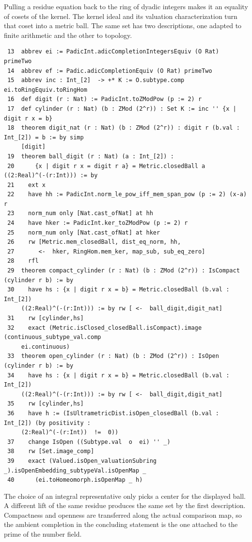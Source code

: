 \documentclass[12pt,letterpaper]{article}
\begin{document}
Pulling a residue equation back to the ring of dyadic integers makes it an equality of cosets of the kernel. The kernel ideal and its valuation characterization turn that coset into a metric ball. The same set has two descriptions, one adapted to finite arithmetic and the other to topology.
\par
{\fontsize{8.8}{10.5}\selectfont\begin{verbatim}
 13  abbrev ei := PadicInt.adicCompletionIntegersEquiv (O Rat) primeTwo
 14  abbrev ef := Padic.adicCompletionEquiv (O Rat) primeTwo
 15  abbrev inc : Int_[2]  -> +* K := O.subtype.comp ei.toRingEquiv.toRingHom
 16  def digit (r : Nat) := PadicInt.toZModPow (p := 2) r
 17  def cylinder (r : Nat) (b : ZMod (2^r)) : Set K := inc '' {x | digit r x = b}
 18  theorem digit_nat (r : Nat) (b : ZMod (2^r)) : digit r (b.val : Int_[2]) = b := by simp
     [digit]
 19  theorem ball_digit (r : Nat) (a : Int_[2]) :
 20      {x | digit r x = digit r a} = Metric.closedBall a ((2:Real)^(-(r:Int))) := by
 21    ext x
 22    have hh := PadicInt.norm_le_pow_iff_mem_span_pow (p := 2) (x-a) r
 23    norm_num only [Nat.cast_ofNat] at hh
 24    have hker := PadicInt.ker_toZModPow (p := 2) r
 25    norm_num only [Nat.cast_ofNat] at hker
 26    rw [Metric.mem_closedBall, dist_eq_norm, hh,
 27       <-  hker, RingHom.mem_ker, map_sub, sub_eq_zero]
 28    rfl
 29  theorem compact_cylinder (r : Nat) (b : ZMod (2^r)) : IsCompact (cylinder r b) := by
 30    have hs : {x | digit r x = b} = Metric.closedBall (b.val : Int_[2])
     ((2:Real)^(-(r:Int))) := by rw [ <-  ball_digit,digit_nat]
 31    rw [cylinder,hs]
 32    exact (Metric.isClosed_closedBall.isCompact).image (continuous_subtype_val.comp
     ei.continuous)
 33  theorem open_cylinder (r : Nat) (b : ZMod (2^r)) : IsOpen (cylinder r b) := by
 34    have hs : {x | digit r x = b} = Metric.closedBall (b.val : Int_[2])
     ((2:Real)^(-(r:Int))) := by rw [ <-  ball_digit,digit_nat]
 35    rw [cylinder,hs]
 36    have h := (IsUltrametricDist.isOpen_closedBall (b.val : Int_[2]) (by positivity :
     (2:Real)^(-(r:Int))  !=  0))
 37    change IsOpen ((Subtype.val  o  ei) '' _)
 38    rw [Set.image_comp]
 39    exact (Valued.isOpen_valuationSubring _).isOpenEmbedding_subtypeVal.isOpenMap _
 40      (ei.toHomeomorph.isOpenMap _ h)
\end{verbatim}}
The choice of an integral representative only picks a center for the displayed ball. A different lift of the same residue produces the same set by the first description. Compactness and openness are transferred along the actual comparison map, so the ambient completion in the concluding statement is the one attached to the prime of the number field.
\end{document}
